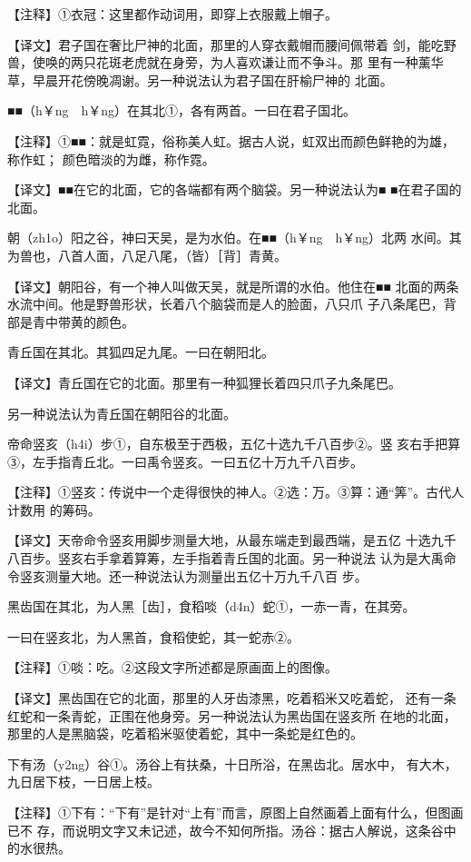 \documentclass[a4paper,12pt,UTF8,twoside]{ctexbook}
\begin{document}
【注释】①衣冠：这里都作动词用，即穿上衣服戴上帽子。

【译文】君子国在奢比尸神的北面，那里的人穿衣戴帽而腰间佩带着 剑，能吃野兽，使唤的两只花斑老虎就在身旁，为人喜欢谦让而不争斗。那 里有一种薰华草，早晨开花傍晚凋谢。另一种说法认为君子国在肝榆尸神的 北面。

■■（h￥ng　h￥ng）在其北①，各有两首。一曰在君子国北。

【注释】①■■：就是虹霓，俗称美人虹。据古人说，虹双出而颜色鲜艳的为雄，称作虹； 颜色暗淡的为雌，称作霓。

【译文】■■在它的北面，它的各端都有两个脑袋。另一种说法认为■ ■在君子国的北面。

朝（zh1o）阳之谷，神曰天吴，是为水伯。在■■（h￥ng　h￥ng）北两 水间。其为兽也，八首人面，八足八尾，（皆）［背］青黄。

【译文】朝阳谷，有一个神人叫做天吴，就是所谓的水伯。他住在■■ 北面的两条水流中间。他是野兽形状，长着八个脑袋而是人的脸面，八只爪 子八条尾巴，背部是青中带黄的颜色。

青丘国在其北。其狐四足九尾。一曰在朝阳北。

【译文】青丘国在它的北面。那里有一种狐狸长着四只爪子九条尾巴。

另一种说法认为青丘国在朝阳谷的北面。

帝命竖亥（h4i）步①，自东极至于西极，五亿十选九千八百步②。竖 亥右手把算③，左手指青丘北。一曰禹令竖亥。一曰五亿十万九千八百步。

【注释】①竖亥：传说中一个走得很快的神人。②选：万。③算：通“筭”。古代人计数用 的筹码。

【译文】天帝命令竖亥用脚步测量大地，从最东端走到最西端，是五亿 十选九千八百步。竖亥右手拿着算筹，左手指着青丘国的北面。另一种说法 认为是大禹命令竖亥测量大地。还一种说法认为测量出五亿十万九千八百 步。

黑齿国在其北，为人黑［齿］，食稻啖（d4n）蛇①，一赤一青，在其旁。

一曰在竖亥北，为人黑首，食稻使蛇，其一蛇赤②。

【注释】①啖：吃。②这段文字所述都是原画面上的图像。

【译文】黑齿国在它的北面，那里的人牙齿漆黑，吃着稻米又吃着蛇， 还有一条红蛇和一条青蛇，正围在他身旁。另一种说法认为黑齿国在竖亥所 在地的北面，那里的人是黑脑袋，吃着稻米驱使着蛇，其中一条蛇是红色的。

下有汤（y2ng）谷①。汤谷上有扶桑，十日所浴，在黑齿北。居水中， 有大木，九日居下枝，一日居上枝。

【注释】①下有：“下有”是针对“上有”而言，原图上自然画着上面有什么，但图画已不 存，而说明文字又未记述，故今不知何所指。汤谷：据古人解说，这条谷中的水很热。
\end{document}

